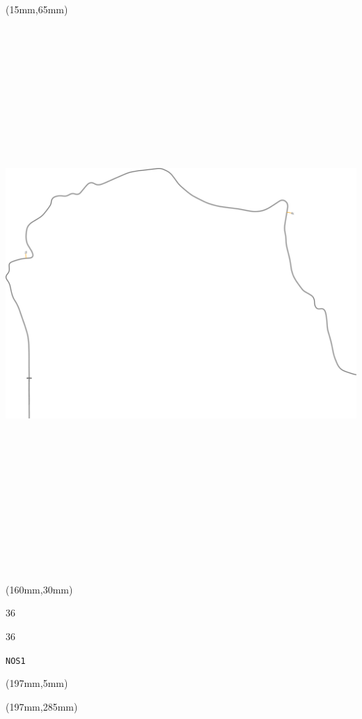 \begin{textblock*}{185mm}(15mm,65mm)%
\centering
\mbox{\includegraphics[width=185mm,height=210mm,keepaspectratio]{PT/NOS1.pdf}}
\end{textblock*}
\begin{textblock*}{40mm}(160mm,30mm)%
\Large
\par{} 
\par36 
\par36 
\par\hfill\tiny\tt NOS1\\
\end{textblock*}
\begin{textblock*}{20mm}(197mm,5mm)%
\fbox{\thepage}
\label{NOS1}
\end{textblock*}
\begin{textblock*}{20mm}(197mm,285mm)%
\fbox{\thepage}
\end{textblock*}

